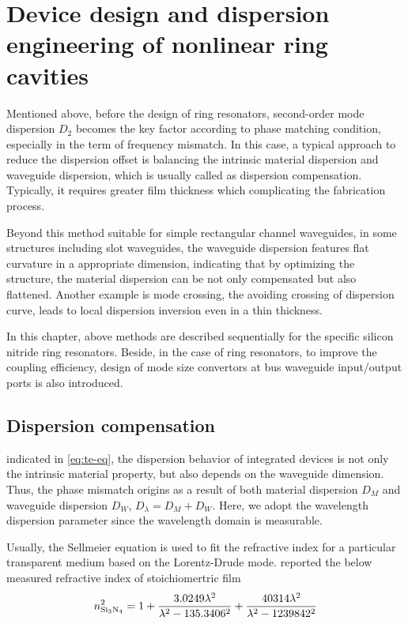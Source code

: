 
\chapter{Device design and dispersion engineering of nonlinear ring cavities}

Mentioned above, before the design of ring resonators, second-order mode dispersion $ D_2 $ becomes the key factor according to phase matching condition, especially in the term of frequency mismatch. In this case, a typical approach to reduce the dispersion offset is balancing the intrinsic material dispersion and waveguide dispersion, which is usually called as dispersion compensation. Typically, it requires greater film thickness which complicating the fabrication process. 

Beyond this method suitable for simple rectangular channel waveguides, in some structures including slot waveguides, the waveguide dispersion features flat curvature in a appropriate dimension, indicating that by optimizing the structure, the material dispersion can be not only compensated but also flattened. Another example is mode crossing, the avoiding crossing of dispersion curve, leads to local dispersion inversion even in a thin thickness. 

In this chapter, above methods are described sequentially for the specific silicon nitride ring resonators. Beside, in the case of ring resonators, to improve the coupling efficiency, design of mode size convertors at bus waveguide input/output ports is also introduced.

\section{Dispersion compensation}\label{sec:disp-comp}
indicated in \autoref{eq:te-eq}, the dispersion behavior of integrated devices is not only the intrinsic material property, but also depends on the waveguide dimension. Thus, the phase mismatch origins as a result of both material dispersion $D_M$ and waveguide dispersion $ D_W $, $D_{\lambda}= D_M + D_W$. Here, we adopt the wavelength dispersion parameter since the wavelength domain is measurable.

Usually, the Sellmeier equation is used to fit the refractive index for a particular transparent medium based on the Lorentz-Drude mode. \citeauthor{Luke2015a} reported the below measured refractive index of stoichiomertric  film \cite{Luke2015a}
\begin{equation}\label{eq:si3n4-selleimeier}
    n_{\ce{Si3N4}}^2 = 1 + \frac{3.0249 \lambda^2}{\lambda^2-135.3406^2} + \frac{40314 \lambda^2}{\lambda^2 - 1239842^2}
\end{equation}

